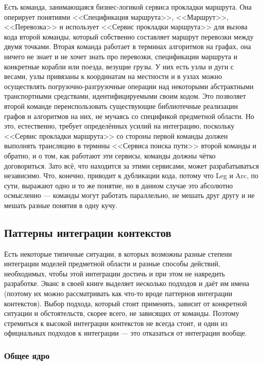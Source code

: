 \documentclass[a5paper]{article}
\begin{document}
Есть команда, занимающаяся бизнес-логикой сервиса прокладки маршрута. Она оперирует понятиями <<Спецификация маршрута>>, <<Маршрут>>, <<Перевозка>> и использует <<Сервис прокладки маршрута>> для вызова кода второй команды, который собственно составляет маршрут перевозки между двумя точками. Вторая команда работает в терминах алгоритмов на графах, она ничего не знает и не хочет знать про перевозки, спецификации маршрута и конкретные корабли или поезда, везущие грузы. У них есть узлы и дуги с весами, узлы привязаны к координатам на местности и в узлах можно осуществлять погрузочно-разгрузочные операции над некоторыми абстрактными транспортными средствами, идентифицируемыми своим кодом. Это позволяет второй команде переиспользовать существующие библиотечные реализации графов и алгоритмов на них, не мучаясь со спецификой предметной области. Но это, естественно, требует определённых усилий на интеграцию, поскольку <<Сервис прокладки маршрута>> со стороны первой команды должен выполнять трансляцию в термины <<Сервиса поиска пути>> второй команды и обратно, и о том, как работают эти сервисы, команды должны чётко договориться. Зато всё, что находится за этими сервисами, может разрабатываться независимо. Что, конечно, приводит к дубликации кода, потому что Leg и Arc, по сути, выражают одно и то же понятие, но в данном случае это абсолютно осмысленно --- команды могут работать параллельно, не мешать друг другу и не мешать разные понятия в одну кучу.

\subsection{Паттерны интеграции контекстов}

Есть некоторые типичные ситуации, в которых возможны разные степени интеграции моделей предметной области и разные способы действий, необходимых, чтобы этой интеграции достичь и при этом не навредить разработке. Эванс в своей книге выделяет несколько подходов и даёт им имена (поэтому их можно рассматривать как что-то вроде паттернов интеграции контекстов). Выбор подхода, который стоит применять, зависит от конкретной ситуации и обстоятельств, скорее всего, не зависящих от команды. Поэтому стремиться к высокой интеграции контекстов не всегда стоит, и один из официальных подходов к интеграции --- это отказаться от интеграции вообще.

\subsubsection{Общее ядро}
\end{document}
